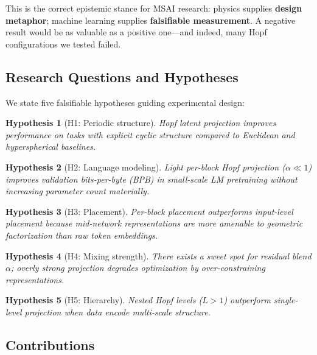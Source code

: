 \documentclass[11pt,twocolumn]{article}
\newtheorem{hypothesis}{Hypothesis}
\begin{document}
This is the correct epistemic stance for MSAI research: physics supplies \textbf{design metaphor}; machine learning supplies \textbf{falsifiable measurement}. A negative result would be as valuable as a positive one---and indeed, many Hopf configurations we tested failed.

\subsection{Research Questions and Hypotheses}

We state five falsifiable hypotheses guiding experimental design:

\begin{hypothesis}[H1: Periodic structure]
Hopf latent projection improves performance on tasks with explicit cyclic structure compared to Euclidean and hyperspherical baselines.
\end{hypothesis}

\begin{hypothesis}[H2: Language modeling]
Light per-block Hopf projection ($\alpha \ll 1$) improves validation bits-per-byte (BPB) in small-scale LM pretraining without increasing parameter count materially.
\end{hypothesis}

\begin{hypothesis}[H3: Placement]
Per-block placement outperforms input-level placement because mid-network representations are more amenable to geometric factorization than raw token embeddings.
\end{hypothesis}

\begin{hypothesis}[H4: Mixing strength]
There exists a sweet spot for residual blend $\alpha$; overly strong projection degrades optimization by over-constraining representations.
\end{hypothesis}

\begin{hypothesis}[H5: Hierarchy]
Nested Hopf levels ($L>1$) outperform single-level projection when data encode multi-scale structure.
\end{hypothesis}

\subsection{Contributions}
\end{document}
